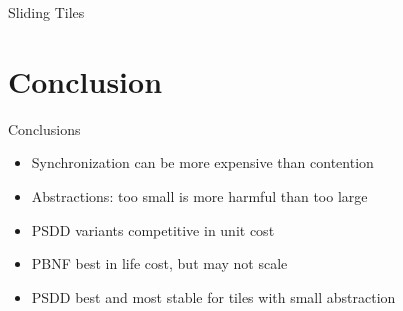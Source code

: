 \documentclass[style=unh]{powerdot}
\begin{document}
\begin{slide}{Sliding Tiles}
\end{slide}


\section{Conclusion}


\begin{slide}{Conclusions}
  \begin{itemize}
  \item Synchronization can be more expensive than contention
  \item Abstractions: too small is more harmful than too large
  \item PSDD variants competitive in unit cost
  \item PBNF best in life cost, but may not scale
  \item PSDD best and most stable for tiles with small abstraction
  \end{itemize}
\end{slide}

\end{document}
